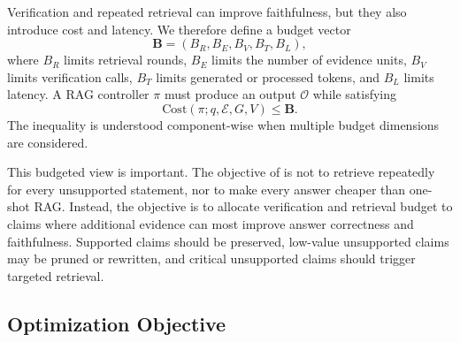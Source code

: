 Verification and repeated retrieval can improve faithfulness, but they also introduce cost and latency. We therefore define a budget vector
\begin{equation}
    \mathbf{B} = (B_R, B_E, B_V, B_T, B_L),
\end{equation}
where $B_R$ limits retrieval rounds, $B_E$ limits the number of evidence units, $B_V$ limits verification calls, $B_T$ limits generated or processed tokens, and $B_L$ limits latency. A RAG controller $\pi$ must produce an output $\mathcal{O}$ while satisfying
\begin{equation}
    \mathrm{Cost}(\pi; q, \mathcal{E}, G, V) \leq \mathbf{B}.
    \label{eq:budget_constraint}
\end{equation}
The inequality is understood component-wise when multiple budget dimensions are considered.

This budgeted view is important. The objective of \ragname is not to retrieve repeatedly for every unsupported statement, nor to make every answer cheaper than one-shot RAG. Instead, the objective is to allocate verification and retrieval budget to claims where additional evidence can most improve answer correctness and faithfulness. Supported claims should be preserved, low-value unsupported claims may be pruned or rewritten, and critical unsupported claims should trigger targeted retrieval.

\subsection{Optimization Objective}
\label{subsec:optimization_objective}

